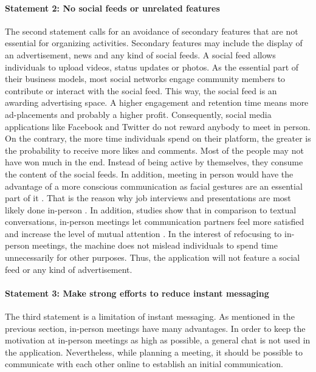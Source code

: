 \documentclass[12pt,numbers=noenddot,parskip,bibliography=totocnumbered,listof=totocnumbered,draft]{scrreprt}
\begin{document}
\paragraph{Statement 2: No social feeds or unrelated features}
The second statement calls for an avoidance of secondary features that are not essential for organizing activities. Secondary features may include the display of an advertisement, news and any kind of social feeds. A social feed allows individuals to upload videos, status updates or photos. As the essential part of their business models, most social networks engage community members to contribute or interact with the social feed. This way, the social feed is an awarding advertising space. A higher engagement and retention time means more ad-placements and probably a higher profit. Consequently, social media applications like Facebook and Twitter do not reward anybody to meet in person. On the contrary, the more time individuals spend on their platform, the greater is the probability to receive more likes and comments. Most of the people may not have won much in the end. Instead of being active by themselves, they consume the content of the social feeds. In addition, meeting in person would have the advantage of a more conscious communication as facial gestures are an essential part of it  \citep{vanderkam2017}. That is the reason why job interviews and presentations are most likely done in-person \citep{vanderkam2017}. In addition, studies show that in comparison to textual conversations, in-person meetings let communication partners feel more satisfied and increase the level of mutual attention \citep{vanderkam2017}. \newline
In the interest of refocusing to in-person meetings, the machine does not mislead individuals to spend time unnecessarily for other purposes. Thus, the application will not feature a social feed or any kind of advertisement.

\paragraph{Statement 3: Make strong efforts to reduce instant messaging}
The third statement is a limitation of instant messaging. As mentioned in the previous section, in-person meetings have many advantages. In order to keep the motivation at in-person meetings as high as possible, a general chat is not used in the application. Nevertheless, while planning a meeting, it should be possible to communicate with each other online to establish an initial communication.
\end{document}
